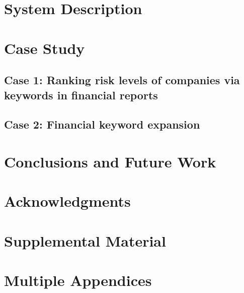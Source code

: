 \documentclass[11pt]{article}
\begin{document}
\section{System Description}


\section{Case Study}
\subsection{Case 1: Ranking risk levels of companies via keywords in financial reports}
\subsection{Case 2: Financial keyword expansion}
\section{Conclusions and Future Work}

\section*{Acknowledgments}





\appendix
\section{Supplemental Material} \label{sec:supplemental}
\section{Multiple Appendices}
\end{document}
